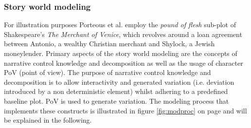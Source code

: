 \subsubsection{Story world modeling}
For illustration purposes Porteous et al. \cite{Porteous10} employ the \emph{pound of flesh} sub-plot of Shakespeare's \emph{The Merchant of Venice}, which revolves around a loan agreement between Antonio, a wealthy Christian merchant and Shylock, a Jewish moneylender. Primary aspects of the story world modeling are the concepts of narrative control knowledge and decomposition as well as the usage of character PoV (point of view). The purpose of narrative control knowledge and decomposition is to allow interactivity and generated variation (i.e. deviation introduced by a non deterministic element) whilst adhering to a predefined baseline plot. PoV is used to generate variation. The modeling process that implements these constructs is illustrated in figure \ref{fig:modproc} on page \pageref{fig:modproc} and will be explained in the following.

